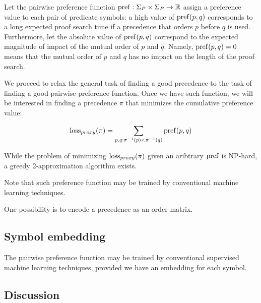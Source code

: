 Let the pairwise preference
function \(\operatorname{pref} : \Sigma_P \times \Sigma_P \rightarrow \operatorname{\mathbb{R}}\)
assign a preference value to each pair of predicate symbols:
a high value of \(\operatorname{pref}(p, q)\) corresponds to a long expected proof search time
if a precedence that orders \(p\) before \(q\) is used.
Furthermore, let the absolute value of \(\operatorname{pref}(p, q)\)
correspond to the expected magnitude of impact of the mutual order of \(p\) and \(q\).
Namely, \(\operatorname{pref}(p, q) = 0\) means that the mutual order of \(p\) and \(q\)
has no impact on the length of the proof search.

We proceed to relax the general task of finding a good precedence
to the task of finding a good pairwise preference function.
Once we have such function,
we will be interested in finding a precedence \(\pi\) that minimizes the cumulative preference value:

\begin{align*}
\operatorname{loss}_{proxy}(\pi) = \sum_{p, q: \pi^{-1}(p) < \pi^{-1}(q)} \operatorname{pref}(p, q)
\end{align*}

While the problem of minimizing \(\operatorname{loss}_{proxy}(\pi)\) given an aribtrary \(\operatorname{pref}\) is NP-hard,
a greedy 2-approximation algorithm exists.\cite{Cohen2011}

Note that such preference function may be trained by conventional machine learning techniques.

One possibility is to encode a precedence as an \gls{order-matrix}.

\subsection{Symbol embedding}

The pairwise preference function may be trained by conventional supervised machine learning techniques,
provided we have an embedding for each symbol.

\subsection{Discussion}

